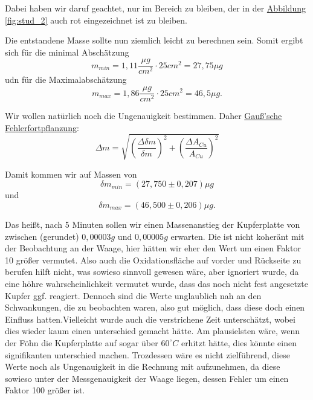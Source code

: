 Dabei haben wir daruf geachtet, nur im Bereich zu bleiben, der in der \hyperref[fig:stud_2]{Abbildung \ref*{fig:stud_2}} auch rot eingezeichnet ist zu bleiben.

Die entstandene Masse sollte nun ziemlich leicht zu berechnen sein. Somit ergibt sich für die minimal Abschätzung
\begin{equation}
    m_{min} = 1,11 \frac{\mu g}{cm^2} \cdot 25cm^2 = 27,75 \mu g 
\end{equation}
udn für die Maximalabschätzung
\begin{equation}
    m_{max} = 1,86 \frac{\mu g}{cm^2} \cdot 25cm^2 = 46,5 \mu g.
\end{equation}

Wir wollen natürlich noch die Ungenauigkeit bestimmen. Daher \hyperref[eq:gauss_fehlfortpflanzung]{Gauß'sche Fehlerfortpflanzung}:
\begin{equation}
    \Delta m = \sqrt{\left(\frac{\Delta \delta m}{\delta m} \right)^2 + \left(\frac{\Delta A_{Cu}}{A_{Cu}} \right)^2}
\end{equation}

Damit kommen wir auf Massen von 
\begin{equation}
    \boxed{\delta m_{min} = (27,750 \pm 0,207) \mu g}
\end{equation}
und
\begin{equation}
    \boxed{\delta m_{max} = (46,500 \pm 0,206 ) \mu g}.
\end{equation}

Das heißt, nach 5 Minuten sollen wir einen Massenanstieg der Kupferplatte von zwischen (gerundet) $0,00003g$ und $0,00005g$ erwarten.
Die ist nicht koheränt mit der Beobachtung an der Waage, hier hätten wir eher den Wert um einen Faktor 10 größer vermutet.
Also auch die Oxidationsfläche auf vorder und Rückseite zu berufen hilft nicht, was sowieso sinnvoll gewesen wäre, aber ignoriert wurde, da eine höhre wahrscheinlichkeit vermutet wurde, dass das noch nicht fest angesetzte Kupfer ggf. reagiert.
Dennoch sind die Werte unglaublich nah an den Schwankungen, die zu beobachten waren, also gut möglich, dass diese doch einen Einfluss hatten.Vielleicht wurde auch die verstrichene Zeit unterschätzt, wobei dies wieder kaum einen unterschied gemacht hätte. Am plausielsten wäre, wenn der Föhn die Kupferplatte auf sogar über $60^\circ C$ erhitzt hätte, dies könnte einen signifikanten unterschied machen.
Trozdessen wäre es nicht zielführend, diese Werte noch als Ungenauigkeit in die Rechnung mit aufzunehmen, da diese sowieso unter der Messgenauigkeit der Waage liegen, dessen Fehler um einen Faktor 100 größer ist.

